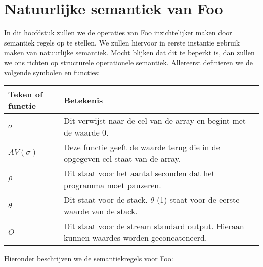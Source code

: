 \documentclass[11pt]{article}
\begin{document}
\section{Natuurlijke semantiek van Foo}
In dit hoofdstuk zullen we de operaties van Foo inzichtelijker maken door semantiek regels op te stellen. 
We zullen hiervoor in eerste instantie gebruik maken van natuurlijke semantiek.
Mocht blijken dat dit te beperkt is, dan zullen we ons richten op structurele operationele semantiek.
Allereerst definieren we de volgende symbolen en functies:
\newline
\newline
\begin{tabular}{ | l | p{12cm} |}
    \hline
    Teken of functie & Betekenis \\ \hline
    \begin{math} \sigma \end{math} &  Dit verwijst naar de cel van de array en begint met de waarde 0. \\ \hline
    \begin{math} AV(\sigma) \end{math} & Deze functie geeft de waarde terug die in de opgegeven cel staat van de array. \\ \hline
    \begin{math} \rho \end{math} &  Dit staat voor het aantal seconden dat het programma moet pauzeren. \\ \hline
    \begin{math} \theta \end{math} &  Dit staat voor de stack. \begin{math}\theta\end{math} (1) staat voor de eerste waarde van de stack. \\ \hline
    \begin{math} O \end{math} &  Dit staat voor de stream standard output. Hieraan kunnen waardes worden geconcateneerd. \\ \hline

\end{tabular}
\newline
\newline
\newline
Hieronder beschrijven we de semantiekregels voor Foo:
\end{document}
